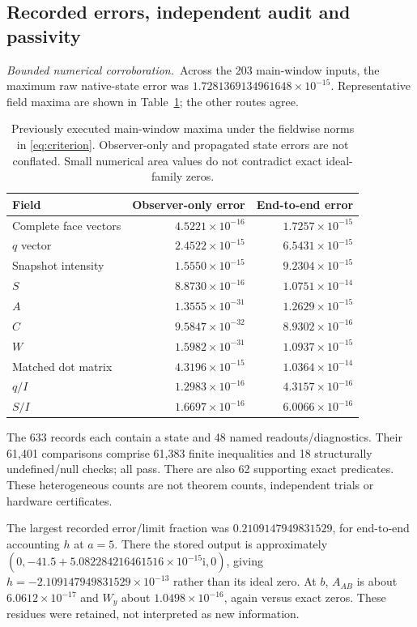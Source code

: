 \documentclass[11pt,a4paper]{article}
\newcommand{\ii}{\mathrm i}\newcommand{\tr}{\operatorname{tr}}
\newcommand{\bounded}{\textit{Bounded numerical corroboration.}}
\begin{document}
\subsection{Recorded errors, independent audit and passivity}
\bounded\ Across the 203 main-window inputs, the maximum raw native-state error was $1.7281369134961648\times10^{-15}$. Representative field maxima are shown in Table~\ref{tab:errors}; the other routes agree.
\begin{table}[htbp]\centering\small
\renewcommand{\arraystretch}{1.15}
\begin{tabular}{lrr}\toprule
Field & Observer-only error & End-to-end error\\\midrule
Complete face vectors & $4.5221\times10^{-16}$ & $1.7257\times10^{-15}$\\
$q$ vector & $2.4522\times10^{-15}$ & $6.5431\times10^{-15}$\\
Snapshot intensity & $1.5550\times10^{-15}$ & $9.2304\times10^{-15}$\\
$S$ & $8.8730\times10^{-16}$ & $1.0751\times10^{-14}$\\
$A$ & $1.3555\times10^{-31}$ & $1.2629\times10^{-15}$\\
$C$ & $9.5847\times10^{-32}$ & $8.9302\times10^{-16}$\\
$W$ & $1.5982\times10^{-31}$ & $1.0937\times10^{-15}$\\
Matched dot matrix & $4.3196\times10^{-15}$ & $1.0364\times10^{-14}$\\
$q/I$ & $1.2983\times10^{-16}$ & $4.3157\times10^{-16}$\\
$S/I$ & $1.6697\times10^{-16}$ & $6.0066\times10^{-16}$\\\bottomrule
\end{tabular}
\caption{Previously executed main-window maxima under the fieldwise norms in \eqref{eq:criterion}. Observer-only and propagated state errors are not conflated. Small numerical area values do not contradict exact ideal-family zeros.}
\label{tab:errors}
\end{table}
The 633 records each contain a state and 48 named readouts/diagnostics. Their 61,401 comparisons comprise 61,383 finite inequalities and 18 structurally undefined/null checks; all pass. There are also 62 supporting exact predicates. These heterogeneous counts are not theorem counts, independent trials or hardware certificates.

The largest recorded error/limit fraction was $0.2109147949831529$, for end-to-end accounting $h$ at $a=5$. There the stored output is approximately $(0,-41.5+5.082284216461516\times10^{-15}\ii,0)$, giving $h=-2.109147949831529\times10^{-13}$ rather than its ideal zero. At $b$, $A_{AB}$ is about $6.0612\times10^{-17}$ and $W_y$ about $1.0498\times10^{-16}$, again versus exact zeros. These residues were retained, not interpreted as new information.
\end{document}
